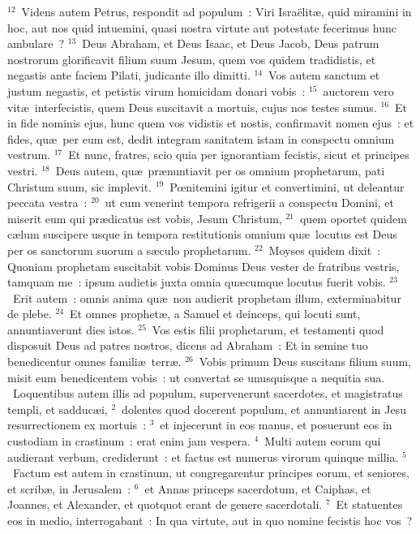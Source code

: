 ${}^{12}$~Videns autem Petrus, respondit ad populum~: Viri Isra\"elit\ae , quid miramini in hoc, aut nos quid intuemini, quasi nostra virtute aut potestate fecerimus hunc ambulare~?
${}^{13}$~Deus Abraham, et Deus Isaac, et Deus Jacob, Deus patrum nostrorum glorificavit filium suum Jesum, quem vos quidem tradidistis, et negastis ante faciem Pilati, judicante illo dimitti.
${}^{14}$~Vos autem sanctum et justum negastis, et petistis virum homicidam donari vobis~:
${}^{15}$~auctorem vero vit\ae\ interfecistis, quem Deus suscitavit a mortuis, cujus nos testes sumus.
${}^{16}$~Et in fide nominis ejus, hunc quem vos vidistis et nostis, confirmavit nomen ejus~: et fides, qu\ae\ per eum est, dedit integram sanitatem istam in conspectu omnium vestrum.
${}^{17}$~Et nunc, fratres, scio quia per ignorantiam fecistis, sicut et principes vestri.
${}^{18}$~Deus autem, qu\ae\ pr\ae nuntiavit per os omnium prophetarum, pati Christum suum, sic implevit.
${}^{19}$~Pœnitemini igitur et convertimini, ut deleantur peccata vestra~:
${}^{20}$~ut cum venerint tempora refrigerii a conspectu Domini, et miserit eum qui pr\ae dicatus est vobis, Jesum Christum,
${}^{21}$~quem oportet quidem c\ae lum suscipere usque in tempora restitutionis omnium qu\ae\ locutus est Deus per os sanctorum suorum a s\ae culo prophetarum.
${}^{22}$~Moyses quidem dixit~: Quoniam prophetam suscitabit vobis Dominus Deus vester de fratribus vestris, tamquam me~: ipsum audietis juxta omnia qu\ae cumque locutus fuerit vobis.
${}^{23}$~Erit autem~: omnis anima qu\ae\ non audierit prophetam illum, exterminabitur de plebe.
${}^{24}$~Et omnes prophet\ae , a Samuel et deinceps, qui locuti sunt, annuntiaverunt dies istos.
${}^{25}$~Vos estis filii prophetarum, et testamenti quod disposuit Deus ad patres nostros, dicens ad Abraham~: Et in semine tuo benedicentur omnes famili\ae\ terr\ae .
${}^{26}$~Vobis primum Deus suscitans filium suum, misit eum benedicentem vobis~: ut convertat se unusquisque a nequitia sua.
~\lettrine[lines=10,image=true,loversize=0.05,lraise=-0.03]{L}{}oquentibus autem illis ad populum, supervenerunt sacerdotes, et magistratus templi, et sadduc\ae i,
${}^{2}$~dolentes quod docerent populum, et annuntiarent in Jesu resurrectionem ex mortuis~:
${}^{3}$~et injecerunt in eos manus, et posuerunt eos in custodiam in crastinum~: erat enim jam vespera.
${}^{4}$~Multi autem eorum qui audierant verbum, crediderunt~: et factus est numerus virorum quinque millia.
${}^{5}$~Factum est autem in crastinum, ut congregarentur principes eorum, et seniores, et scrib\ae , in Jerusalem~:
${}^{6}$~et Annas princeps sacerdotum, et Caiphas, et Joannes, et Alexander, et quotquot erant de genere sacerdotali.
${}^{7}$~Et statuentes eos in medio, interrogabant~: In qua virtute, aut in quo nomine fecistis hoc vos~?


